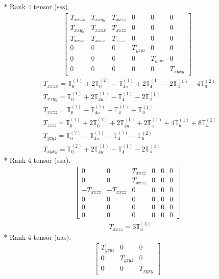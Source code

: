 \documentclass[fleqn,8pt,landscape]{jsarticle}
\begin{document}
* Rank 4 tensor (sss).
\begin{align*}
\begin{bmatrix} T_{xxxx} & T_{xxyy} & T_{xxzz} & 0 & 0 & 0 \\ T_{xxyy} & T_{xxxx} & T_{xxzz} & 0 & 0 & 0 \\ T_{xxzz} & T_{xxzz} & T_{zzzz} & 0 & 0 & 0 \\ 0 & 0 & 0 & T_{yzyz} & 0 & 0 \\ 0 & 0 & 0 & 0 & T_{yzyz} & 0 \\ 0 & 0 & 0 & 0 & 0 & T_{xyxy} \end{bmatrix}
\end{align*}
\begin{align*}
& T_{xxxx} = \mathbb{T}_{0}^{(1)} + 2 \mathbb{T}_{0}^{(2)} - \mathbb{T}_{4u}^{(1)} + 2 \mathbb{T}_{4}^{(1)} - 2 \mathbb{T}_{u}^{(1)} - 4 \mathbb{T}_{u}^{(2)} \\
& T_{xxyy} = \mathbb{T}_{0}^{(1)} + 2 \mathbb{T}_{4u}^{(1)} - \mathbb{T}_{4}^{(1)} - 2 \mathbb{T}_{u}^{(1)} \\
& T_{xxzz} = \mathbb{T}_{0}^{(1)} - \mathbb{T}_{4u}^{(1)} - \mathbb{T}_{4}^{(1)} + \mathbb{T}_{u}^{(1)} \\
& T_{zzzz} = \mathbb{T}_{0}^{(1)} + 2 \mathbb{T}_{0}^{(2)} + 2 \mathbb{T}_{4u}^{(1)} + 2 \mathbb{T}_{4}^{(1)} + 4 \mathbb{T}_{u}^{(1)} + 8 \mathbb{T}_{u}^{(2)} \\
& T_{yzyz} = \mathbb{T}_{0}^{(2)} - \mathbb{T}_{4u}^{(1)} - \mathbb{T}_{4}^{(1)} + \mathbb{T}_{u}^{(2)} \\
& T_{xyxy} = \mathbb{T}_{0}^{(2)} + 2 \mathbb{T}_{4u}^{(1)} - \mathbb{T}_{4}^{(1)} - 2 \mathbb{T}_{u}^{(2)}
\end{align*}
* Rank 4 tensor (ssa).
\begin{align*}
\begin{bmatrix} 0 & 0 & T_{xxzz} & 0 & 0 & 0 \\ 0 & 0 & T_{xxzz} & 0 & 0 & 0 \\ - T_{xxzz} & - T_{xxzz} & 0 & 0 & 0 & 0 \\ 0 & 0 & 0 & 0 & 0 & 0 \\ 0 & 0 & 0 & 0 & 0 & 0 \\ 0 & 0 & 0 & 0 & 0 & 0 \end{bmatrix}
\end{align*}
\begin{align*}
& T_{xxzz} = 3 \mathbb{T}_{u}^{(3)}
\end{align*}
* Rank 4 tensor (aas).
\begin{align*}
\begin{bmatrix} T_{yzyz} & 0 & 0 \\ 0 & T_{yzyz} & 0 \\ 0 & 0 & T_{xyxy} \end{bmatrix}
\end{align*}
\end{document}
